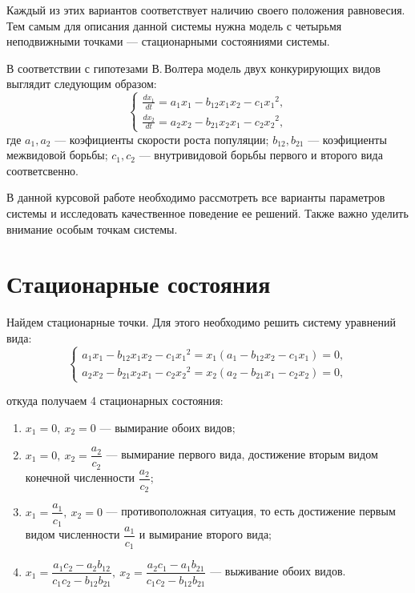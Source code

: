 \documentclass[12pt,a4paper]{article}
\begin{document}
    Каждый из этих вариантов соответствует наличию своего положения равновесия. Тем самым для описания данной системы нужна модель с четырьмя неподвижными точками --- стационарными состояниями системы.

    В соответствии с гипотезами В.\,Волтера модель двух конкурирующих видов выглядит следующим образом:
    \begin{equation}
        \label{volterra}
        \begin{cases}
            \frac{dx_1}{dt} = a_1 x_1 - b_{12} x_1 x_2 - c_1 {x_1}\!^2,
            \\
            \frac{dx_2}{dt} = a_2 x_2 - b_{21} x_2 x_1 - c_2 {x_2}\!^2 ,
        \end{cases}
    \end{equation}
    \noindent где $a_1, a_2$ --- коэфициенты скорости роста популяции; $b_{12}, b_{21}$ --- коэфициенты межвидовой борьбы; $c_1, c_2$ --- внутривидовой борьбы первого и второго вида соответсвенно.

    В данной курсовой работе необходимо рассмотреть все варианты параметров системы и исследовать качественное поведение ее решений. Также важно уделить внимание особым точкам системы.

    \section{Стационарные состояния}

    Найдем стационарные точки. Для этого необходимо решить систему уравнений вида: 
    \begin{equation}
        \label{seps}
        \begin{cases}
            a_1 x_1 - b_{12} x_1 x_2 - c_1 {x_1}\!^2 = x_1 (a_1 - b_{12} x_2 - c_1 x_1) = 0,
            \\
            a_2 x_2 - b_{21} x_2 x_1 - c_2 {x_2}\!^2 = x_2 (a_2 - b_{21} x_1 - c_2 x_2) = 0,
        \end{cases}
    \end{equation}
    
    \noindent откуда получаем 4 стационарных состояния:
    \begin{enumerate}
        \setlength\itemsep{0.5em}
        \item $ x_1 = 0,\ x_2 = 0 $ --- вымирание обоих видов;
        \item $ x_1 = 0,\ x_2 = \dfrac{a_2}{c_2} $ --- вымирание первого вида, достижение вторым видом конечной численности $ \dfrac{a_2}{c_2} $;
        \item $ x_1 = \dfrac{a_1}{c_1},\ x_2 = 0 $ --- противоположная ситуация, то есть достижение первым видом численности $ \dfrac{a_1}{c_1} $ и вымирание второго вида;
        \item $ x_1 = \dfrac{a_1 c_2 - a_2 b_{12}}{c_1 c_2 - b_{12} b_{21}},\ x_2 = \dfrac{a_2 c_1 - a_1 b_{21}}{c_1 c_2 - b_{12} b_{21}}$ --- выживание обоих видов.
    \end{enumerate} 
\end{document}
